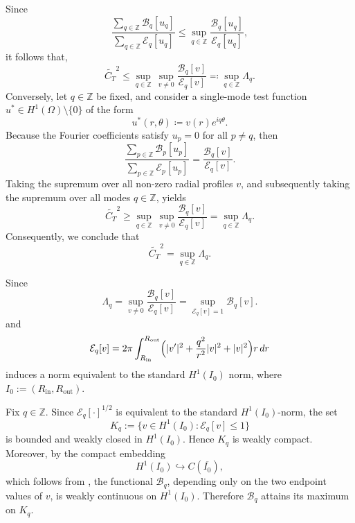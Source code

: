 \documentclass[12pt,reqno]{amsart}
\numberwithin{equation}{section}
\begin{document}
Since
\[
\dfrac{\sum_{q\in\mathbb{Z}}\mathcal{B}_q[u_q]}{\sum_{q\in\mathbb{Z}}\mathcal{E}_q[u_q]}\leq\sup_{q\in\mathbb{Z}}\dfrac{\mathcal{B}_q[u_q]}{\mathcal{E}_q[u_q]},
\]
it follows that,
\begin{equation*}
    \widetilde{C_T}^2 \le \sup_{q \in \mathbb{Z}} \, \sup_{v \neq 0} \frac{\mathcal{B}_q[v]}{\mathcal{E}_q[v]} \eqqcolon \sup_{q \in \mathbb{Z}} \Lambda_q.
\end{equation*}
Conversely, let $q \in \mathbb{Z}$ be fixed, and consider a single-mode test function $u^* \in H^1(\Omega) \setminus \{0\}$ of the form
\begin{equation*}
    u^*(r,\theta) \coloneqq v(r) e^{iq\theta}.
\end{equation*}
Because the Fourier coefficients satisfy $u_p = 0$ for all $p \neq q$, then
\begin{equation*}
    \frac{\sum_{p \in \mathbb{Z}} \mathcal{B}_p[u_p]}{\sum_{p \in \mathbb{Z}} \mathcal{E}_p[u_p]}
    = \frac{\mathcal{B}_q[v]}{\mathcal{E}_q[v]}.
\end{equation*}
Taking the supremum over all non-zero radial profiles $v$, and subsequently taking the supremum over all modes $q \in \mathbb{Z}$, yields
\begin{equation*}
    \widetilde{C_T}^2 \ge \sup_{q \in \mathbb{Z}} \, \sup_{v \neq 0} \frac{\mathcal{B}_q[v]}{\mathcal{E}_q[v]} = \sup_{q \in \mathbb{Z}} \Lambda_q.
\end{equation*}
Consequently, we conclude that
\begin{equation*}
    \widetilde{C_T}^2 = \sup_{q \in \mathbb{Z}} \Lambda_q.
\end{equation*}

Since
\begin{equation*}
    \Lambda_q = \sup_{v \neq 0} \frac{\mathcal{B}_q[v]}{\mathcal{E}_q[v]} = \sup_{\mathcal{E}_q[v] = 1} \mathcal{B}_q[v].
\end{equation*}
and
\begin{equation*}
    \mathcal{E}_q[v] = 2\pi \int_{R_{\mathrm{in}}}^{R_{\mathrm{out}}} \Bigl( |v'|^2 + \frac{q^2}{r^2} |v|^2 + |v|^2 \Bigr) r \, dr
\end{equation*}
induces a norm equivalent to the standard $H^1(I_0)$ norm, where  \(I_0:=(R_{\mathrm{in}},R_{\mathrm{out}})\).


Fix \(q\in\mathbb Z\). Since
\(\mathcal E_q[\cdot]^{1/2}\) is equivalent to the standard \(H^1(I_0)\)-norm,
the set
\[
K_q:=\{v\in H^1(I_0):\mathcal E_q[v]\leq 1\}
\]
is bounded and weakly closed in \(H^1(I_0)\). Hence \(K_q\) is weakly compact.
Moreover, by the compact embedding
\[
H^1(I_0)\hookrightarrow C(\overline{I_0}),
\]
which follows from \cite[Theorem 1.2.5]{wu2006}, the functional
\(\mathcal B_q\), depending only on the two endpoint values of \(v\), is
weakly continuous on \(H^1(I_0)\). Therefore \(\mathcal B_q\) attains its
maximum on \(K_q\).
\end{document}
